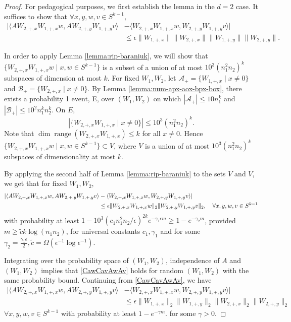 \documentclass[11pt]{article}
\newcommand{\ctilde}{\tilde{c}}
\newcommand{\A}{\mathcal{A}}
\newcommand{\calAp}{\A_+}
\newcommand{\calBp}{\mathcal{B}_+}
\newcommand{\eps}{\epsilon}
\newcommand{\spherek}{S^{k-1}}
\newcommand{\red}[1]{{\color{black} #1}}
\newcommand{\Wipxn}[1]{W_{#1, +, x}}
\newcommand{\Wipyn}[1]{W_{#1, +, y}}
\DeclareMathOperator{\range}{range}
\begin{document}
\begin{proof}
For pedagogical purposes, we first establish the lemma in the $d=2$ case.  It suffices to show that $\forall x, y,w, v \in \spherek$,
\begin{align*}
 | \langle A \Wipxn{2} \Wipxn{1} w, A \Wipyn{2} \Wipyn{1} v \rangle &- \langle \Wipxn{2} \Wipxn{1}  w , \Wipyn{2} \Wipyn{1}  v\rangle | \\&\leq \eps \|\Wipxn{1}\| \| \Wipxn{2} \| \|\Wipyn{1}\| \| \Wipyn{2}\|.
\end{align*}

In order to apply Lemma \ref{lemma:rip-baraniuk}, we will show that $\{ \Wipxn{2} \Wipxn{1} w \mid x, w \in \spherek \}$ is a subset of a union of at most $10^3 (n_1^2 n_2)^k$ subspaces of dimension at most $k$. 
For fixed \red{$W_1,W_2$}, let $\calAp = \{\Wipxn{1} \mid x \neq 0\}$ and $\calBp = \{\Wipxn{2} \mid x \neq 0\}$.  
By Lemma \ref{lemma:num-apx-aox-bpx-box}, there exists a probability 1 event, E, over \red{$(W_1,W_2)$} on which $|\calAp| \leq 10 n_1^k$ and $|\calBp| \leq 10^2 n_1^k n_2^k$. 
On $E$, 
\[
|\{ \Wipxn{2} \Wipxn{1} \mid x \neq 0\}| \leq 10^3 (n_1^2 n_2)^k.
\]
 Note that $\dim \range(\Wipxn{2} \Wipxn{1}) \leq k$ for all $x \neq 0$.  Hence $\{ \Wipxn{2} \Wipxn{1} w \mid x, w \in \spherek \} \subset V$, where $V$ is a union of at most $10^3 (n_1^2 n_2)^k$ subspaces of dimensionality at most $k$. 

By applying \red{the second half of} Lemma \ref{lemma:rip-baraniuk} to the sets $V$ and $V$, we get that for fixed \red{$W_1,W_2$}, 
\begin{align}
| \langle A \Wipxn{2} \Wipxn{1} w, A \Wipyn{2} \Wipyn{1} v \rangle &- \langle \Wipxn{2} \Wipxn{1} w, \Wipyn{2} \Wipyn{1} v \rangle |  \notag
\\&\leq \eps \|\Wipxn{2} \Wipxn{1} w\|_2 \| \Wipyn{2} \Wipyn{1} v \|_2, \quad \forall x,y, w, v \in \spherek \label{CawCavAwAv}
\end{align}
with probability at least $1 - 10^3 (c_1 n_1^2 n_2/\eps)^{2k} e^{-\gamma_1 \eps m} \geq 1 - e^{-\gamma_2 m}$, provided $m \geq \ctilde k \log(n_1 n_2)$, for universal constants $c_1, \gamma_1$ and for some $\gamma_2 = \frac{\gamma_1 \eps}{2}, \ctilde =\Omega(\eps^{-1} \log \eps^{-1})$. 

Integrating over the probability space of \red{$(W_1,W_2)$, independence of $A$ and $(W_1,W_2)$} implies that  \eqref{CawCavAwAv} holds for random \red{$(W_1,W_2)$} with the same probability bound.
Continuing from \eqref{CawCavAwAv}, we have
\begin{align*}
| \langle A \Wipxn{2} \Wipxn{1} w, A \Wipyn{2} \Wipyn{1} v \rangle &- \langle \Wipxn{2} \Wipxn{1} w, \Wipyn{2} \Wipyn{1} v \rangle | \\&\leq \eps \|\Wipxn{1}\|_2 \|\Wipyn{1}\|_2 \|\Wipxn{2}\|_2 \|\Wipyn{2}\|_2 
\end{align*}
$\forall x,y, w, v \in \spherek$ with probability at least $1 -  e^{-\gamma m}$. for some $\gamma>0$. 


\end{proof}
\end{document}
